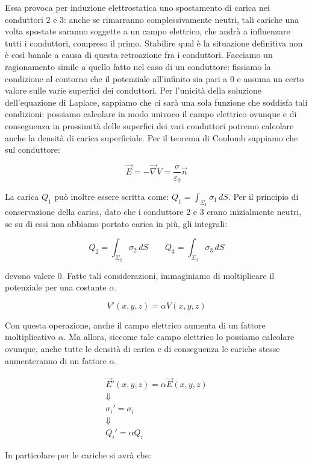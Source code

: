 Essa provoca per induzione elettrostatica uno spostamento di carica nei conduttori $2$ e $3$: anche se rimarranno complessivamente neutri, tali cariche una volta spostate saranno soggette a un campo elettrico, che andrà a influenzare tutti i conduttori, compreso il primo. Stabilire qual è la situazione definitiva non è così banale a causa di questa retroazione fra i conduttori. Facciamo un ragionamento simile a quello fatto nel caso di un conduttore: fissiamo la condizione al contorno che il potenziale all'infinito sia pari a $0$ e assuma un certo valore sulle varie superfici dei conduttori. Per l'unicità della soluzione dell'equazione di Laplace, sappiamo che ci sarà una sola funzione che soddisfa tali condizioni: possiamo calcolare in modo univoco il campo elettrico ovunque e di conseguenza in prossimità delle superfici dei vari conduttori potremo calcolare anche la densità di carica superficiale.
Per il teorema di Coulomb sappiamo che sul conduttore:

\[
	\vec{E} = - \vec{\nabla} V = \frac{\sigma}{\varepsilon_0}\vec{n}
\]

La carica $ Q_1  $ può inoltre essere scritta come: $ Q_1 = \int_{\Sigma_1}\sigma_1\,dS$. Per il principio di conservazione della carica, dato che i conduttore $2$ e $3$ erano inizialmente neutri, se su di essi non abbiamo portato carica in più, gli integrali:

\[
	Q_2=\int_{\Sigma_2}\sigma_2\,dS \qquad Q_3=\int_{\Sigma_3}\sigma_3\,dS
\]

devono valere $0$.
Fatte tali considerazioni, immaginiamo di moltiplicare il potenziale per una costante $ \alpha  $.

\[
	V'(x,y,z) = \alpha V(x,y,z)
\]

Con questa operazione, anche il campo elettrico aumenta di un fattore moltiplicativo $ \alpha  $. Ma allora, siccome tale campo elettrico lo possiamo calcolare ovunque, anche tutte le densità di carica e di conseguenza le cariche stesse aumenteranno di un fattore $\alpha$.

\begin{gather*}
	\vec{E}'(x,y,z) = \alpha \vec{E} (x,y,z) \\
	\Downarrow \\
	\sigma_i'=\sigma_i \\
	\Downarrow \\
	Q_i' = \alpha Q_i
\end{gather*}

In particolare per le cariche si avrà che:

